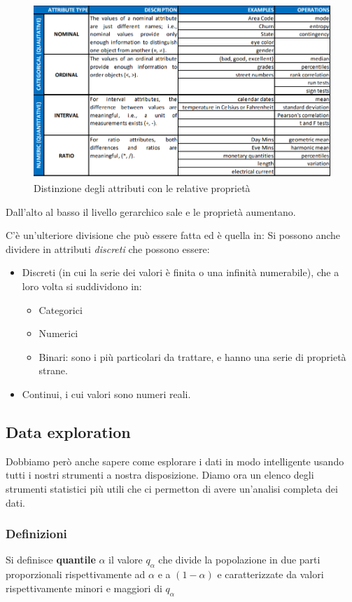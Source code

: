 \begin{figure}[H]
	\centering
	\includegraphics[height=0.5 \linewidth]{introduction/pict/attributi.png}
	\caption{Distinzione degli attributi con le relative proprietà}
\end{figure}
Dall'alto al basso il livello gerarchico sale e le proprietà aumentano.

C'è un'ulteriore divisione che può essere fatta ed è quella in:
Si possono anche dividere in attributi \textit{discreti} che possono essere:
\begin{itemize}
	\item Discreti (in cui la serie dei valori è finita o una infinità numerabile), che a loro volta si suddividono in:
	\begin{itemize}
		\item Categorici
		\item Numerici
		\item Binari: sono i più particolari da trattare, e hanno una serie di proprietà strane.
	\end{itemize}
	\item Continui, i cui valori sono numeri reali.
\end{itemize}

\subsection{Data exploration}

Dobbiamo però anche sapere come esplorare i dati in modo intelligente usando tutti i nostri strumenti a nostra disposizione. Diamo ora un elenco degli strumenti statistici più utili che ci permetton di avere un'analisi completa dei dati.

\subsubsection{Definizioni}
\begin{defn}
	Si definisce \textbf{quantile} $\alpha$ il valore $q_{\alpha}$ che divide la popolazione in due parti proporzionali rispettivamente ad $\alpha$ e a $(1 - \alpha)$ e caratterizzate da valori rispettivamente minori e maggiori di $q_{\alpha}$
\end{defn}

